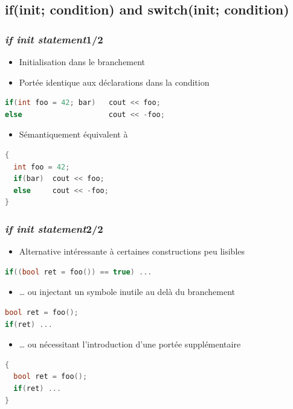 \documentclass[C++.tex]{subfiles}
\begin{document}
\subsection*{if(init; condition) and switch(init; condition)}
\begin{frame}[fragile]
	\frametitle{\textit{if init statement}\titlehfill{}1/2}
	\begin{itemize}
		\item Initialisation dans le branchement
		\item Portée identique aux déclarations dans la condition
	\end{itemize}

	\begin{lstlisting}[language=C++]
if(int foo = 42; bar)   cout << foo;
else                    cout << -foo;\end{lstlisting}

	\begin{itemize}
		\item Sémantiquement équivalent à
	\end{itemize}

	\begin{lstlisting}[language=C++]
{
  int foo = 42;
  if(bar)  cout << foo;
  else     cout << -foo;
}\end{lstlisting}
\end{frame}

\begin{frame}[fragile]
	\frametitle{\textit{if init statement}\titlehfill{}2/2}
	\begin{itemize}
		\item Alternative intéressante à certaines constructions peu lisibles
	\end{itemize}

	\begin{lstlisting}[language=C++]
if((bool ret = foo()) == true) ...\end{lstlisting}

	\begin{itemize}
		\item \ldots{} ou injectant un symbole inutile au delà du branchement
	\end{itemize}

	\begin{lstlisting}[language=C++]
bool ret = foo();
if(ret) ...\end{lstlisting}

	\begin{itemize}
		\item \ldots{} ou nécessitant l'introduction d'une portée supplémentaire
	\end{itemize}

	\begin{lstlisting}[language=C++]
{
  bool ret = foo();
  if(ret) ...
}\end{lstlisting}
\end{frame}
\end{document}
